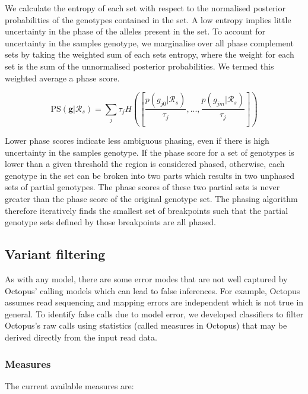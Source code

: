 \documentclass{article}
\begin{document}
We calculate the entropy of each set with respect to the normalised posterior probabilities of the genotypes contained in the set. A low entropy implies little uncertainty in the phase of the alleles present in the set. To account for uncertainty in the samples genotype, we marginalise over all phase complement sets by taking the weighted sum of each sets entropy, where the weight for each set is the sum of the unnormalised posterior probabilities. We termed this weighted average a phase score.

\begin{equation}
    \text{PS}(\boldsymbol{g} | \mathcal{R}_s) = \sum_j \tau_j H\left(\left[\frac{p(g_{j0} | \mathcal{R}_s)}{\tau_j}, ..., \frac{p(g_{jm}| \mathcal{R}_s)}{\tau_j}\right]\right)
\end{equation}

Lower phase scores indicate less ambiguous phasing, even if there is high uncertainty in the samples genotype. If the phase score for a set of genotypes is lower than a given threshold the region is considered phased, otherwise, each genotype in the set can be broken into two parts which results in two unphased sets of partial genotypes. The phase scores of these two partial sets is never greater than the phase score of the original genotype set. The phasing algorithm therefore iteratively finds the smallest set of breakpoints such that the partial genotype sets defined by those breakpoints are all phased.


\subsection{Variant filtering}

As with any model, there are some error modes that are not well captured by Octopus’ calling models which can lead to false inferences. For example, Octopus assumes read sequencing and mapping errors are independent which is not true in general. To identify false calls due to model error, we developed classifiers to filter Octopus’s raw calls using statistics (called measures in Octopus) that may be derived directly from the input read data.

\subsubsection{Measures}

The current available measures are:
\end{document}
